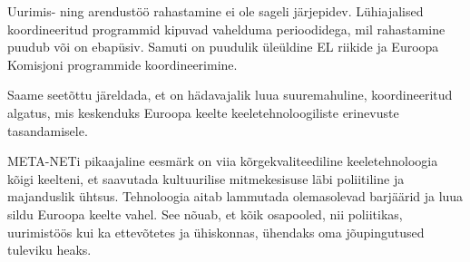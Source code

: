 \begin{multicols}{2}
Uurimis- ning arendustöö rahastamine ei ole sageli järjepidev. 
Lühiajalised koordineeritud programmid kipuvad vahelduma perioodidega, mil rahastamine puudub või on ebapüsiv. 
Samuti on puudulik üleüldine EL riikide ja Euroopa Komisjoni  programmide koordineerimine.

Saame seetõttu järeldada, et on hädavajalik luua suuremahuline, koordineeritud algatus, mis keskenduks Euroopa keelte keeletehnoloogiliste erinevuste tasandamisele.

META-NETi pikaajaline eesmärk on viia kõrgekvaliteediline keeletehnoloogia kõigi keelteni, et saavutada kultuurilise mitmekesisuse läbi poliitiline ja majanduslik ühtsus. 
Tehnoloogia aitab lammutada olemasolevad barjäärid ja luua sildu Euroopa keelte vahel. 
See nõuab, et kõik osapooled, nii poliitikas, uurimistöös kui ka ettevõtetes ja ühiskonnas, ühendaks oma jõupingutused tuleviku heaks.

\end{multicols}

\cleardoublepage



